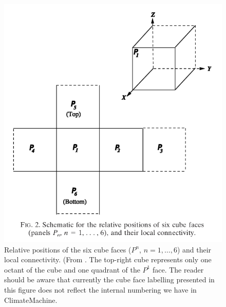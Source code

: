 \documentclass{report}
\begin{document}
\begin{figure}
    \centering
    \includegraphics[scale=0.4]{CLIMA-atmos/figures/numerics/NairFig2.png}
    \caption{Relative positions of the six cube faces ($P^n$, $n=1, \dots, 6$) and their local connectivity. (From \cite{Nair2005}. The top-right cube represents only one octant of the cube and one quadrant of the $P^1$ face. The reader should be aware that currently the cube face labelling presented in this figure does not reflect the internal numbering we have in ClimateMachine. }
    \label{fig:NairFig2}
\end{figure}
\end{document}
